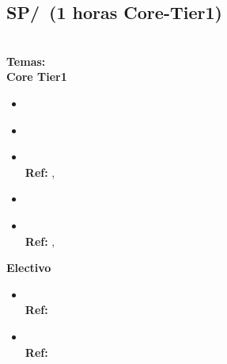 \subsection{SP/\SPProfessionalCommunication~(1 horas Core-Tier1)}\label{sec:BOK:SPProfessionalCommunication}
\SPProfessionalCommunicationDescription\\
\noindent \textbf{Temas:}\\
\noindent \textbf{Core Tier1}
\begin{itemize}
	\item \SPProfessionalCommunicationTopicReading\label{sec:BOK:SPProfessionalCommunicationTopicReading}
	\item \SPProfessionalCommunicationTopicWriting\label{sec:BOK:SPProfessionalCommunicationTopicWriting}
	\item \SPProfessionalCommunicationTopicDynamics\xspace \\ \textbf{Ref:} , \label{sec:BOK:SPProfessionalCommunicationTopicDynamics}
	\item \SPProfessionalCommunicationTopicCommunicating\label{sec:BOK:SPProfessionalCommunicationTopicCommunicating}
	\item \SPProfessionalCommunicationTopicUtilizing\xspace \\ \textbf{Ref:} , \label{sec:BOK:SPProfessionalCommunicationTopicUtilizing}
\end{itemize}

\noindent \textbf{Electivo}
\begin{itemize}
	\item \SPProfessionalCommunicationTopicDealing\xspace \\ \textbf{Ref:} \label{sec:BOK:SPProfessionalCommunicationTopicDealing}
	\item \SPProfessionalCommunicationTopicTradeoffs\xspace \\ \textbf{Ref:} \label{sec:BOK:SPProfessionalCommunicationTopicTradeoffs}
\end{itemize}


